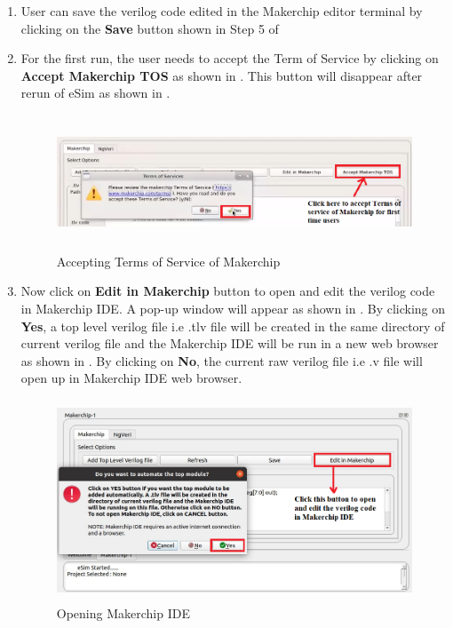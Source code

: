 \begin{enumerate}
\item User can save the verilog code edited in the Makerchip editor terminal by clicking on the \textbf{Save} button shown in Step 5 of 

\item For the first run, the user needs to accept the Term of Service by clicking on \textbf{Accept Makerchip TOS} as shown in . This button will disappear after rerun of eSim as shown in . 

\begin{figure}[H]
\centering
\includegraphics[width = 13cm, height = 4cm]{./NgVeri/acceptTOS.png}
\caption{Accepting Terms of Service of Makerchip}
\label{TOS}
\end{figure}

\item Now click on \textbf{Edit in Makerchip} button to open and edit the verilog code in Makerchip IDE. A pop-up window will appear as shown in . By clicking on \textbf{Yes}, a top level verilog file i.e .tlv file will be created in the same directory of current verilog file and the Makerchip IDE will be run in a new web browser as shown in . By clicking on \textbf{No}, the current raw verilog file i.e .v file will open up in Makerchip IDE web browser. 

\begin{figure}[H]
\centering
\includegraphics[width = 14cm, height = 6cm]{./NgVeri/editinmakerchip.png}
\caption{Opening Makerchip IDE}
\label{editinmakerchip}
\end{figure}


\end{enumerate}
